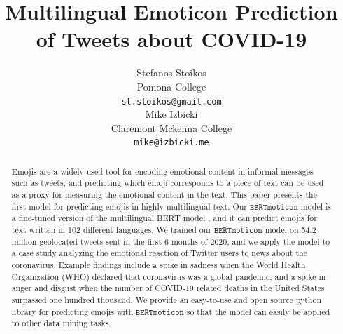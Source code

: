 \documentclass[11pt]{article}
\title{Multilingual Emoticon Prediction of Tweets about COVID-19 \emoji{mask_photo.png} }
\author{Stefanos Stoikos \\
  Pomona College\\
  {\tt st.stoikos@gmail.com} \\\And
  Mike Izbicki \\
  Claremont Mckenna College\\
  {\tt mike@izbicki.me} \\}
\date{}
\newcommand{\bertmoji}{\texttt{BERTmoticon}}
\newcommand{\bert}{\text{multilingual BERT}}
\begin{document}
\maketitle
\begin{abstract}
    Emojis are a widely used tool for encoding emotional content in informal messages such as tweets,
    and predicting which emoji corresponds to a piece of text can be used as a proxy for measuring the emotional content in the text.
    This paper presents the first model for predicting emojis in highly multilingual text.
    Our $\bertmoji$ model is a fine-tuned version of the $\bert$ model \citep{devlin2018bert},
    and it can predict emojis for text written in 102 different languages.
    We trained our $\bertmoji$ model on 54.2 million geolocated tweets sent in the first 6 months of 2020,
    and we apply the model to a case study analyzing the emotional reaction of Twitter users to news about the coronavirus.
    Example findings include a spike in sadness when the World Health Organization (WHO) declared that coronavirus was a global pandemic,
    and a spike in anger and disgust when the number of COVID-19 related deaths in the United States surpassed one hundred thousand.
    We provide an easy-to-use and open source python library for predicting emojis with $\bertmoji$ so that the model can easily be applied to other data mining tasks.
\end{abstract}

%
% 
\end{document}

